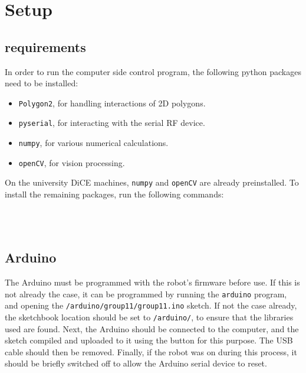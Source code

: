 \section{Setup}
\subsection{requirements}

In order to run the computer side control program, the following python
packages need to be installed:

\begin{itemize}
\item \texttt{Polygon2}, for handling interactions of 2D polygons.
\item \texttt{pyserial}, for interacting with the serial RF device.
\item \texttt{numpy}, for various numerical calculations.
\item \texttt{openCV}, for vision processing.
\end{itemize}

On the university DiCE machines, \texttt{numpy} and \texttt{openCV} are already
preinstalled. To install the remaining packages, run the following commands:

 \\
 \\

\subsection{Arduino}

The Arduino must be programmed with the robot's firmware before use. If this is
not already the case, it can be programmed by running the \texttt{arduino}
program, and opening the \texttt{/arduino/group11/group11.ino} sketch. If not
the case already, the sketchbook location should be set to \texttt{/arduino/},
to ensure that the libraries used are found. Next, the Arduino should be
connected to the computer, and the sketch compiled and uploaded to it using the
button for this purpose. The USB cable should then be removed. Finally, if the
robot was on during this process, it should be briefly switched off to allow
the Arduino serial device to reset.
